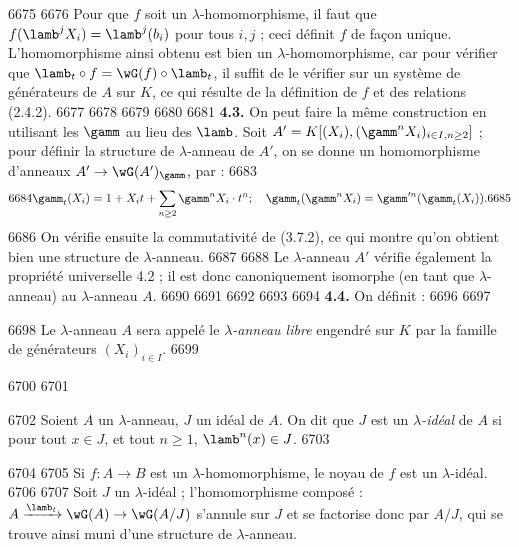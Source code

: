   6675	
  6676	Pour que $f$ soit un $\lambda$-homomorphisme, il faut que $f(\lamb^j X_i) = \lamb^j(b_i)$ pour tous $i, j$ ; ceci d\'efinit $f$ de fa\c con unique. L'homomorphisme ainsi obtenu est bien un $\lambda$-homomorphisme, car pour v\'erifier que $\lamb_t \circ f = \wG(f) \circ \lamb_t$, il suffit de le v\'erifier sur un syst\`eme de g\'en\'erateurs de $A$ sur $K$, ce qui r\'esulte de la d\'efinition de $f$ et des relations (2.4.2).
  6677	
  6678	%
  6679	%
  6680	%
  6681		\noindent\textbf{4.3.} On peut faire la m\^eme construction en utilisant les $\gamm$ au lieu des $\lamb$. Soit $A' = K[(X_i), (\gamm^n X_i)_{i \in I, n \geq 2}]$ ; pour d\'efinir la structure de $\lambda$-anneau de $A'$, on se donne un homomorphisme d'anneaux $A' \to \wG(A')_\gamm$, par :
  6683	\begin{equation}
  6684	\gamm_t(X_i) = 1 + X_i t + \sum_{n \geq 2} \gamm^n X_i \cdot t^n ; \quad \gamm_t(\gamm^n X_i) = \gamm'^n(\gamm_t(X_i)).
  6685	\end{equation}
  6686	On v\'erifie ensuite la commutativit\'e de (3.7.2), ce qui montre qu'on obtient bien une structure de $\lambda$-anneau.
  6687	
  6688		Le $\lambda$-anneau $A'$ v\'erifie \'egalement la propri\'et\'e universelle 4.2 ; il est donc canoniquement isomorphe (en tant que $\lambda$-anneau) au $\lambda$-anneau $A$.
  6690	
  6691	%
  6692	%
  6693	%
  6694		\noindent\textbf{4.4.} On d\'efinit :
  6696	
  6697	\begin{definition}
  6698	Le $\lambda$-anneau $A$ sera appel\'e le \emph{$\lambda$-anneau libre} engendr\'e sur $K$ par la famille de g\'en\'erateurs $(X_i)_{i \in I}$.
  6699	\end{definition}
  6700	
  6701	\begin{definition}
  6702	Soient $A$ un $\lambda$-anneau, $J$ un id\'eal de $A$. On dit que $J$ est un \emph{$\lambda$-id\'eal} de $A$ si pour tout $x \in J$, et tout $n \geq 1$, $\lamb^n(x) \in J$.
  6703	\end{definition}
  6704	
  6705	Si $f : A \to B$ est un $\lambda$-homomorphisme, le noyau de $f$ est un $\lambda$-id\'eal.
  6706	
  6707		Soit $J$ un $\lambda$-id\'eal ; l'homomorphisme compos\'e : $A \xrightarrow{\lamb_t} \wG(A) \to \wG(A/J)$ s'annule sur $J$ et se factorise donc par $A/J$, qui se trouve ainsi muni d'une structure de $\lambda$-anneau.
